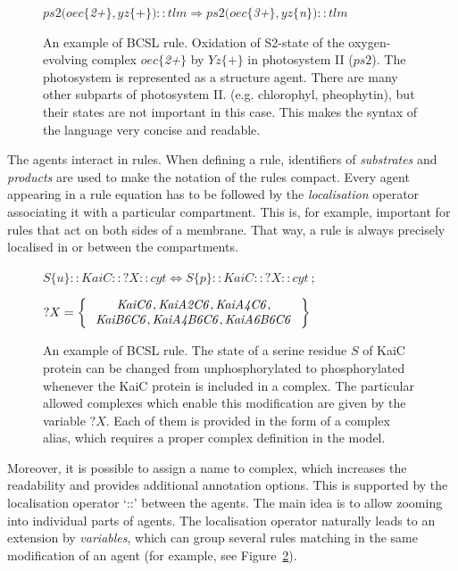 \documentclass[11pt,a4paper]{report}
\begin{document}
\begin{figure}[!h]
  \begin{center}
    $ \mathit{ps2}(oec\{$\emph{2+}$\}, yz\{$+$\}){::}tlm \Rightarrow \mathit{ps2}(oec\{$\emph{3+}$\}, yz\{$\emph{n}$\}){::}tlm $
  \end{center}
  \caption{An example of BCSL rule. Oxidation of S2-state of the oxygen-evolving complex $oec\{$\emph{2+}$\}$ by $Yz\{+\}$ in photosystem II ($\mathit{ps2}$). The photosystem is represented as a structure agent. There are many other subparts of photosystem II. (e.g. chlorophyl, pheophytin), but their states are not important in this case. This makes the syntax of the language very concise and readable.}\label{ps2_rule}
\end{figure}

The agents interact in rules. When defining a rule, identifiers of \emph{substrates} and \emph{products} are used to make the notation of the rules compact. Every agent appearing in a rule equation has to be followed by the \emph{localisation} operator associating it with a particular compartment. This is, for example, important for rules that act on both sides of a membrane. That way, a rule is always precisely localised in or between the compartments.

\begin{figure}[!h]
	\begin{center}
		$ S\{u\}{::}KaiC{::}?X{::}cyt \Leftrightarrow S\{p\}{::}KaiC{::}?X{::}cyt ~;~$\vspace*{0.3cm}
		
		$ ?X = \Set{
			\begin{array}{c}
			\mathit{KaiC6}, \mathit{KaiA2C6}, \mathit{KaiA4C6},\\
			\mathit{KaiB6C6}, \mathit{KaiA4B6C6}, \mathit{KaiA6B6C6}
			\end{array}
		}$
	\end{center}
	\caption{An example of BCSL rule. The state of a serine residue $S$ of KaiC protein can be changed from unphosphorylated to phosphorylated whenever the KaiC protein is included in a complex. The particular allowed complexes which enable this modification are given by the variable $?X$. Each of them is provided in the form of a complex alias, which requires a proper complex definition in the model.}
	\label{BCSL_rule}
\end{figure}

Moreover, it is possible to assign a name to complex, which increases the readability and provides additional annotation options. This is supported by the localisation operator `{::}' between the agents. The main idea is to allow zooming into individual parts of agents. The localisation operator naturally leads to an extension by \emph{variables}, which can group several rules matching in the same modification of an agent (for example, see Figure~\ref{BCSL_rule}).
\end{document}
